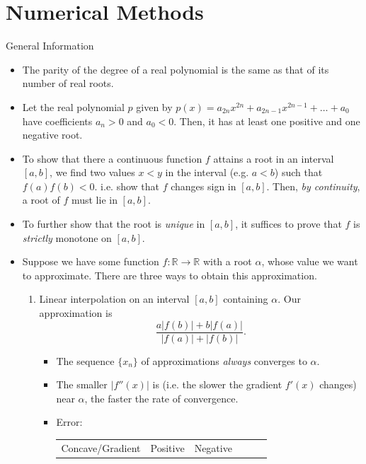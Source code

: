 \documentclass[../Notes.tex]{subfiles}
\begin{document}
\chapter{Numerical Methods}
\begin{stbox}{General Information}
    \begin{itemize}
        \item The parity of the degree of a real polynomial is the same as that of its number of real roots.
        \item Let the real polynomial \(p\) given by \(p(x)=a_{2n}x^{2n}+a_{2n-1}x^{2n-1}+\dots+a_0\) have coefficients \(a_n>0\) and \(a_0<0\). Then, it has at least one positive and one negative root.
        \item To show that there a continuous function \(f\) attains a root in an interval \([a,b]\), we find two values \(x<y\) in the interval (e.g. \(a<b\)) such that \(f(a)f(b)<0\). i.e. show that \(f\) changes sign in \([a,b]\). Then, \emph{by continuity}, a root of \(f\) must lie in \([a,b]\).
        \item To further show that the root is \emph{unique} in \([a,b]\), it suffices to prove that \(f\) is \emph{strictly} monotone on \([a,b]\).
        \item Suppose we have some function \(f \colon \mathbb{R}\to \mathbb{R}\) with a root \(\alpha\), whose value we want to approximate. There are three ways to obtain this approximation.
        \begin{enumerate}
            \item Linear interpolation on an interval \([a,b]\) containing \(\alpha\). Our approximation is
            \[\frac{a \lvert f(b) \rvert+b \lvert f(a) \rvert}{\lvert f(a) \rvert+\lvert f(b) \rvert}.\]
            \begin{itemize}
                \item The sequence \(\{x_n\}\) of approximations \emph{always} converges to \(\alpha\).
                \item The smaller \(\lvert f''(x) \rvert\) is (i.e. the slower the gradient \(f'(x)\) changes) near \(\alpha\), the faster the rate of convergence.
                \item Error:
                \begin{table}[H]
                    \centering
                    \begin{tabular}{|Sc|Sc|Sc|}
                        \hline
                        Concave/Gradient & Positive & Negative\\

\end{tabular}
\end{table}
\end{itemize}
\end{enumerate}
\end{itemize}
\end{stbox}
\end{document}
